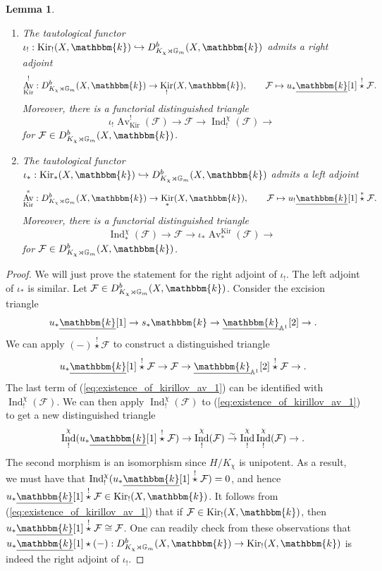 \documentclass{amsart}
\newcommand{\A}{\mathbb{A}}
\newcommand{\G}{\mathbb{G}}
\renewcommand{\k}{\mathbbm{k}}
\newcommand{\scrF}{\mathcal{F}}
\DeclareMathOperator{\Ind}{Ind}
\DeclareMathOperator{\Av}{Av}
\newcommand{\uk}{\underline{\k}}
\DeclareMathOperator{\Kir}{Kir}
\newcommand{\sstar}{\stackrel{*}{\star}}
\newcommand{\cstar}{\stackrel{!}{\star}}
\newtheorem{lemma}[subsubsection]{Lemma}
\theoremstyle{definition}
\begin{document}
    \begin{lemma}\label{lem:existence_of_kirillov_averaging}\qquad
        \begin{enumerate}
        \item The tautological functor $\iota_! : \Kir_! (X, \k) \hookrightarrow D_{K_{\chi} \rtimes \G_m}^b (X, \k)$ admits a right adjoint
        \[\Av^!_{\Kir} : D_{K_{\chi} \rtimes \G_m}^b (X, \k) \to \Kir_! (X, \k), \qquad \scrF \mapsto u_* \uk [1] \cstar \scrF.\]
        Moreover, there is a functorial distinguished triangle
        \[\iota_! \Av^!_{\Kir} (\scrF) \to \scrF \to \Ind_!^{\chi} (\scrF) \to\]
        for $\scrF \in D_{K_{\chi} \rtimes \G_m}^b (X, \k)$.
        \item The tautological functor $\iota_* : \Kir_* (X, \k) \hookrightarrow D_{K_{\chi} \rtimes \G_m}^b (X, \k)$ admits a left adjoint
        \[\Av^*_{\Kir} : D_{K_{\chi} \rtimes \G_m}^b (X, \k) \to \Kir_* (X, \k), \qquad \scrF \mapsto u_! \uk [1] \sstar \scrF.\]
        Moreover, there is a functorial distinguished triangle
        \[\Ind_*^{\chi} (\scrF) \to \scrF \to \iota_* \Av_*^{\Kir} (\scrF) \to\]
        for $\scrF \in D_{K_{\chi} \rtimes \G_m}^b (X, \k)$.
        \end{enumerate}
    \end{lemma}
    \begin{proof}
        We will just prove the statement for the right adjoint of $\iota_!$. The left adjoint of $\iota_*$ is similar.
        Let $\scrF \in D_{K_{\chi} \rtimes \G_m}^b (X, \k)$. Consider the excision triangle
        \[u_* \uk [1] \to s_* \k \to \uk_{\A^1} [2] \to.\]
        We can apply $(-) \cstar \scrF$ to construct a distinguished triangle
        \begin{equation}\label{eq:existence_of_kirillov_av_1}
            u_* \uk [1] \cstar \scrF \to \scrF \to \uk_{\A^1} [2] \cstar \scrF \to.
        \end{equation}
        The last term of (\ref{eq:existence_of_kirillov_av_1}) can be identified with $\Ind_{!}^{\chi} (\scrF)$.
        We can then apply $\Ind_!^{\chi} (\scrF)$ to (\ref{eq:existence_of_kirillov_av_1}) to get a new distinguished triangle
        \[\Ind_!^{\chi} (u_* \uk [1] \cstar \scrF) \to \Ind_!^{\chi} (\scrF) \stackrel{\sim}{\to} \Ind_!^{\chi} \Ind_!^{\chi} (\scrF) \to.\]
        The second morphism is an isomorphism since $H/K_{\chi}$ is unipotent. As a result, we must have that $\Ind_!^{\chi} (u_* \uk [1] \cstar \scrF) = 0$, and hence $u_* \uk [1] \cstar \scrF \in \Kir_! (X, \k)$.
        It follows from (\ref{eq:existence_of_kirillov_av_1}) that if $\scrF \in \Kir_! (X, \k)$, then $u_* \uk [1] \cstar \scrF \cong \scrF$. 
        One can readily check from these observations that $u_* \uk [1] \star (-) : D_{K_{\chi} \rtimes \G_m}^b (X, \k) \to \Kir_! (X, \k)$ is indeed the right adjoint of $\iota_!$.
    \end{proof}
\end{document}
